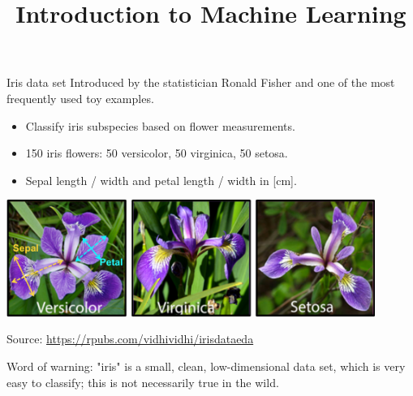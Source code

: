 




\newcommand{\titlefigure}{figure/sample-dgp-2d.pdf}
\newcommand{\learninggoals}{
\item Understand structure of tabular data in ML
\item Understand difference between target and features
\item Understand difference between labeled and unlabeled data
\item Know concept of data-generating process}

\title{Introduction to Machine Learning}
\date{}




\begin{vbframe}{Iris data set}
Introduced by the statistician Ronald Fisher and one
of the most frequently used toy examples.
\begin{itemize}
\item Classify iris subspecies based on flower measurements.
\item 150 iris flowers: 50 versicolor, 50 virginica, 50 setosa.
\item Sepal length / width and petal length / width in [cm].
\end{itemize}

\begin{center}
\includegraphics[width=0.9\textwidth]{figure_man/iris_species.png}

\tiny
Source: \url{https://rpubs.com/vidhividhi/irisdataeda}
\normalsize
\end{center}

\thiscommanddoesnotexist

Word of warning: "iris" is a small, clean, low-dimensional data set,
which is very easy to classify; this is not necessarily true in the wild.

\end{vbframe}

